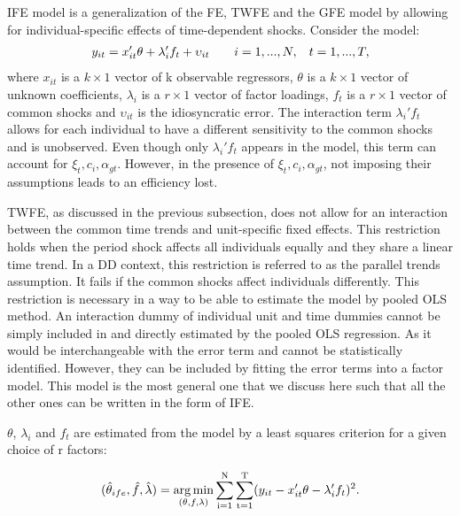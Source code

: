 IFE model is a generalization of the FE, TWFE and the GFE model by allowing for individual-specific effects of time-dependent shocks. 
Consider the model:
\begin{align}
    y_{it} = x_{it}'\theta + \lambda_i' f_t + \upsilon_{it} \hspace{0.7cm} i=1,...,N, \hspace{0.3cm} t=1,...,T,
\end{align}
where $x_{it}$ is a $k \times 1$  vector of k observable regressors, $\theta$ is a $k \times 1$ vector of unknown coefficients, $\lambda_i$ is a $r \times 1$ vector of factor loadings, $f_t$ is a $r \times 1$ vector of common shocks and  $\upsilon_{it}$ is the idiosyncratic error. The interaction term $\lambda_i' f_t $ allows for each individual to have a different sensitivity to the common shocks and is unobserved. Even though only $\lambda_i' f_t$ appears in the model, this term can account for $\xi_t, c_i, \alpha_{gt}$. However, in the presence of $\xi_t, c_i, \alpha_{gt}$, not imposing their assumptions leads to an efficiency lost.

TWFE, as discussed in the previous subsection, does not allow for an interaction between the common time trends and unit-specific fixed effects. This restriction holds when the period shock affects all individuals equally and they share a linear time trend. In a DD context, this restriction is referred to as the parallel trends assumption. It fails if the common shocks affect individuals differently. 
This restriction is necessary in a way to be able to estimate the model by pooled OLS method. An interaction dummy of individual unit and time dummies cannot be simply included in and directly estimated by the pooled OLS regression. As it would be interchangeable with the error term and cannot be statistically identified. However, they can be included by fitting the error terms into a factor model. This model is the most general one that we discuss here such that all the other ones can be written in the form of IFE. 

 
$\theta$, $\lambda_i$ and $f_t $ are estimated from the model by a least squares criterion for a given choice of r factors:

\begin{align}
(\hat{\theta}_{ife},\hat{f}, \hat{\lambda}) = \operatorname*{arg\,min}_{(\theta, f, \lambda)} \operatorname*{\sum_{i=1}^N} \operatorname*{\sum_{t=1}^T} (y_{it} - x_{it}'\theta - \lambda_i' f_t)^2.
\end{align}

